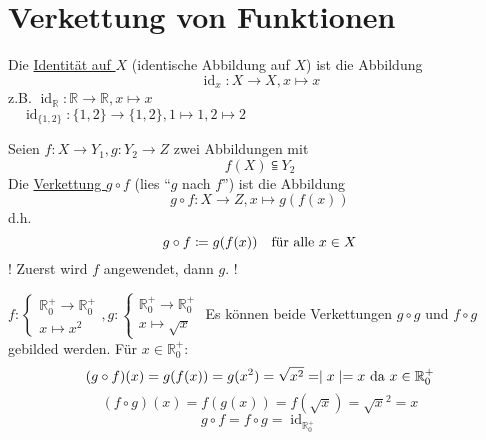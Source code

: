 \documentclass[a4paper, parskip = true, fleqn, headsepline = true]{scrartcl}
\newcommand{\R}{\mathbb{R}}
\begin{document}
\section{Verkettung von Funktionen}
\begin{definition}
	Die \underline{Identität auf $ X $} (identische Abbildung auf $ X $) ist die Abbildung
	\[ \operatorname{id}_x : X \to X, x \mapsto x \]
	z.B. $ \operatorname{id}_{\R} : \R \to \R, x \mapsto x $\\
	$ \quad \operatorname{id}_{\{1, 2\}} : \{ 1, 2 \} \to \{ 1, 2 \}, 1 \mapsto 1, 2 \mapsto 2 $
\end{definition}

\begin{definition}
	Seien $ f : X \to Y_1, g : Y_2 \to Z $ zwei Abbildungen mit 
	\[ f(X) \subseteqq Y_2 \]
	Die \underline{Verkettung $ g \circ f $} (lies ``$ g $ nach $ f $'') ist die Abbildung
	\[ g \circ f : X \to Z, x \mapsto g(f(x)) \]
	d.h.
	\[ g \circ f \coloneqq g(f(x)) \quad \text{für alle $ x \in X $} \]
	! Zuerst wird $ f $ angewendet, dann $ g $. !
\end{definition}

\begin{example}
	$ f :
	\begin{cases}
		\R_{0}^{+} \to \R_{0}^{+}\\
		x \mapsto x^2
	\end{cases},
	g :
	\begin{cases}
		\R_{0}^{+} \to \R_{0}^{+}\\
		x \mapsto \sqrt{x}
	\end{cases} $
	Es können beide Verkettungen $ g \circ g $ und $ f \circ g $ gebilded werden. Für $ x \in \R_{0}^{+} $:
	\[ ( g \circ f )(x) = g(f(x)) = g(x^2) = \sqrt{x^2} = \mid x \mid = x \text{ da $ x \in \R_{0}^{+} $} \]
	\[ ( f \circ g )(x) = f(g(x)) = f(\sqrt{x}) = \sqrt{x}^2 = x \]
	\[ g \circ f = f \circ g = \operatorname{id}_{\R_0^+} \]
\end{example}
\end{document}
